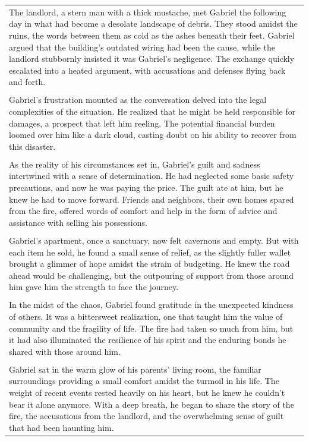 \begin{small}
\begin{longtable}{p{}}
\\
The landlord, a stern man with a thick mustache, met Gabriel the following day in what had become a desolate landscape of debris. They stood amidst the ruins, the words between them as cold as the ashes beneath their feet. Gabriel argued that the building's outdated wiring had been the cause, while the landlord stubbornly insisted it was Gabriel's negligence. The exchange quickly escalated into a heated argument, with accusations and defenses flying back and forth.
\\
\\
Gabriel's frustration mounted as the conversation delved into the legal complexities of the situation. He realized that he might be held responsible for damages, a prospect that left him reeling. The potential financial burden loomed over him like a dark cloud, casting doubt on his ability to recover from this disaster.
\\
\\
As the reality of his circumstances set in, Gabriel's guilt and sadness intertwined with a sense of determination. He had neglected some basic safety precautions, and now he was paying the price. The guilt ate at him, but he knew he had to move forward. Friends and neighbors, their own homes spared from the fire, offered words of comfort and help in the form of advice and assistance with selling his possessions.
\\
\\
Gabriel's apartment, once a sanctuary, now felt cavernous and empty. But with each item he sold, he found a small sense of relief, as the slightly fuller wallet brought a glimmer of hope amidst the strain of budgeting. He knew the road ahead would be challenging, but the outpouring of support from those around him gave him the strength to face the journey.
\\
\\
In the midst of the chaos, Gabriel found gratitude in the unexpected kindness of others. It was a bittersweet realization, one that taught him the value of community and the fragility of life. The fire had taken so much from him, but it had also illuminated the resilience of his spirit and the enduring bonds he shared with those around him.
\\
\\
Gabriel sat in the warm glow of his parents' living room, the familiar surroundings providing a small comfort amidst the turmoil in his life. The weight of recent events rested heavily on his heart, but he knew he couldn't bear it alone anymore. With a deep breath, he began to share the story of the fire, the accusations from the landlord, and the overwhelming sense of guilt that had been haunting him.

\end{longtable}
\end{small}
